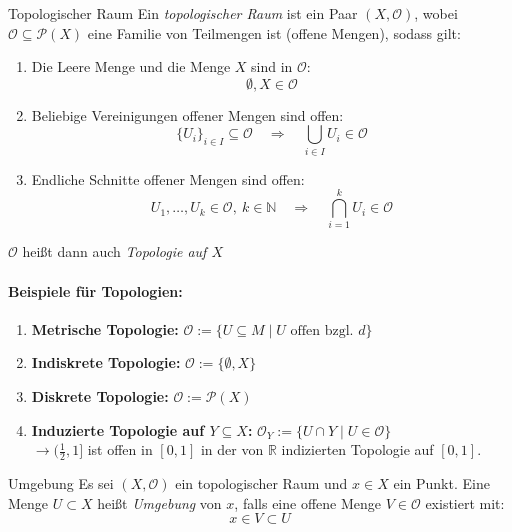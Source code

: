 \begin{definition}{Topologischer Raum}
    Ein \emph{topologischer Raum} ist ein Paar $(X, \mathcal{O})$, wobei $\mathcal{O} \subseteq \mathcal{P}(X)$ eine Familie von Teilmengen ist (offene Mengen), sodass gilt:
    
    \begin{enumerate}
        \item Die Leere Menge und die Menge $X$ sind in $\mathcal{O}$: \\
        \[\emptyset, X \in \mathcal{O}\]
        \item Beliebige Vereinigungen offener Mengen sind offen:
        \[
            \{ U_i \}_{i \in I} \subseteq \mathcal{O} \quad \Rightarrow \quad \bigcup_{i \in I} U_i \in \mathcal{O}
        \]
        \item Endliche Schnitte offener Mengen sind offen:
        \[
            U_1, \dots, U_k \in \mathcal{O},\ k \in \mathbb{N} \quad \Rightarrow \quad \bigcap_{i=1}^k U_i \in \mathcal{O}
        \]
    \end{enumerate}
    
    $\mathcal{O}$ heißt dann auch \emph{Topologie auf $X$}
\end{definition}

\paragraph{Beispiele für Topologien:}
\begin{enumerate}
    \item \textbf{Metrische Topologie:} $\mathcal{O} := \{ U \subseteq M \mid U \text{ offen bzgl. } d \}$
    \item \textbf{Indiskrete Topologie:} $\mathcal{O} := \{\emptyset, X\}$
    \item \textbf{Diskrete Topologie:} $\mathcal{O} := \mathcal{P}(X)$
    \item \textbf{Induzierte Topologie auf $Y \subseteq X$:}
    \(
        \mathcal{O}_Y := \{ U \cap Y \mid U \in \mathcal{O} \}
    \) \\
    $\rightarrow (\frac{1}{2}, 1]$ ist offen in $[0,1]$ in der von $\mathbb{R}$ indizierten Topologie auf $[0,1]$. 
\end{enumerate} 

\begin{definition}{Umgebung}
Es sei $(X, \mathcal{O})$ ein topologischer Raum und $x \in X$ ein Punkt. Eine Menge $U \subset X$ heißt \emph{Umgebung} von $x$, falls eine offene Menge $V \in \mathcal{O}$ existiert mit:
\[
    x \in V \subset U
\]
\end{definition}

